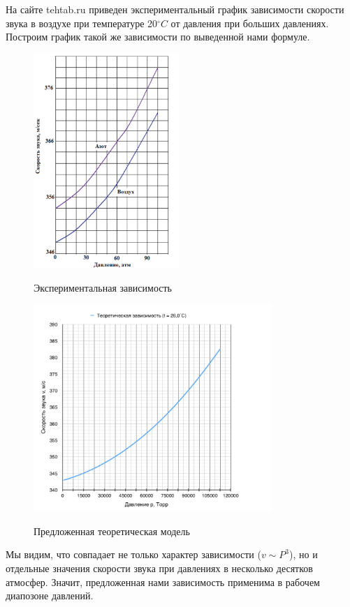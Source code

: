 \documentclass[a4paper,12pt]{article}
\begin{document}
На сайте tehtab.ru приведен экспериментальный график зависимости скорости звука в воздухе при температуре 20$^{\circ} C$ от давления при больших давлениях. Построим график такой же зависимости по выведенной нами формуле.
\begin{figure}[h]
	\begin{multicols}{2}
		\hfill
		\includegraphics[width=55mm]{gr_tehtab.png}
		\hfill
		\caption{Экспериментальная зависимость}
		\label{gr_tehtab}
		\hfill
		\includegraphics[width=90mm]{gr_ThLong.png}
		\hfill
		\caption{Предложенная теоретическая модель}
		\label{gr_ThLong}
	\end{multicols}
\end{figure}

Мы видим, что совпадает не только характер зависимости ($v \sim P^3 $), но и отдельные значения скорости звука при давлениях в несколько десятков атмосфер. Значит, предложенная нами зависимость применима в рабочем диапозоне давлений. 
\end{document}
